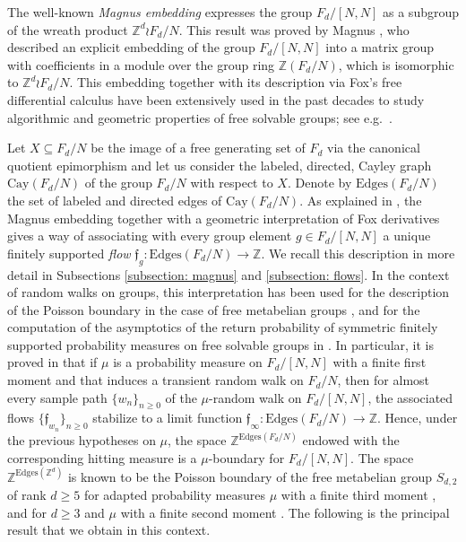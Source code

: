 \documentclass[reqno,oneside,11pt]{amsart}
\newcommand{\Z}{\mathbb{Z}}
\theoremstyle{plain}
\theoremstyle{definition}
\begin{document}
 The well-known \textit{Magnus embedding} expresses the group $F_d/[N,N]$ as a subgroup of the wreath product $\Z^d\wr F_d/N$. This result was proved by Magnus \cite{Magnus1939}, who described an explicit embedding of the group $F_d/[N,N]$ into a matrix group with coefficients in a module over the group ring $\Z(F_d/N)$, which is isomorphic to $\Z^d\wr F_d/N$. This embedding together with its description via Fox's free differential calculus \cite{FoxI,FoxII,FoxIII,FoxIV,FoxV} have been extensively used in the past decades to study algorithmic and geometric properties of free solvable groups; see e.g.\ \cite{RemeslennikovSokolov1970,DromsLewinServatius1993,Vershik2000freesolvable,MyasnikovRomankovUshakovVershik2010,Vassileva2011,Vassileva2012,Ushakov2014,Sale2015}. 
 
 Let $X\subseteq F_d/N$ be the image of a free generating set of $F_d$ via the canonical quotient epimorphism and let us consider the labeled, directed, Cayley graph $\mathrm{Cay}(F_d/N)$ of the group $F_d/N$ with respect to $X$. Denote by $\mathrm{Edges}(F_d/N)$ the set of labeled and directed edges of $\mathrm{Cay}(F_d/N)$. As explained in \cite{DromsLewinServatius1993,Vershik2000freesolvable,MyasnikovRomankovUshakovVershik2010,SaloffCosteZheng2015}, the Magnus embedding together with a geometric interpretation of Fox derivatives gives a way of associating with every group element $g\in F_d/[N,N]$ a unique finitely supported \emph{flow} $\mathfrak{f}_g:\mathrm{Edges}(F_d/N)\to \Z$. We recall this description in more detail in Subsections \ref{subsection: magnus} and \ref{subsection: flows}. In the context of random walks on groups, this interpretation has been used for the description of the Poisson boundary in the case of free metabelian groups \cite{Erschler2011, LyonsPeres2021}, and for the computation of the asymptotics of the return probability of symmetric finitely supported probability measures on free solvable groups in \cite{SaloffCosteZheng2015}. In particular, it is proved in \cite[Lemma 1.2]{Erschler2011} that if $\mu$ is a probability measure on $F_d/[N,N]$ with a finite first moment and that induces a transient random walk on $F_d/N$, then for almost every sample path $\{w_n\}_{n\ge 0}$ of the $\mu$-random walk on $F_d/[N,N]$, the associated flows $\{\mathfrak{f}_{w_n}\}_{n\ge 0}$ stabilize to a limit function $\mathfrak{f}_{\infty}:\mathrm{Edges}(F_d/N)\to \Z$. Hence, under the previous hypotheses on $\mu$, the space $\Z^{\mathrm{Edges}(F_d/N)}$ endowed with the corresponding hitting measure is a $\mu$-boundary for $F_d/[N,N]$. The space $\Z^{\mathrm{Edges}(\Z^d)}$ is known to be the Poisson boundary of the free metabelian group $S_{d,2}$ of rank $d\ge 5$ for adapted probability measures $\mu$ with a finite third moment \cite[Theorem 2]{Erschler2011}, and for $d\ge 3$ and $\mu$ with a finite second moment \cite[Section 6]{LyonsPeres2021}. 
  The following is the principal result that we obtain in this context.
 
\end{document}
